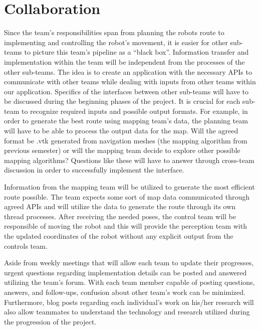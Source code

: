\documentclass[titlepage]{article}
\begin{document}
\section{Collaboration}
Since the team’s responsibilities span from planning the robots route to implementing and controlling the robot’s movement, it is easier for other sub-teams to picture this team’s pipeline as a “black box”. Information transfer and implementation within the team will be independent from the processes of the other sub-teams. The idea is to create an application with the necessary APIs to communicate with other teams while dealing with inputs from other teams within our application. Specifics of the interfaces between other sub-teams will have to be discussed during the beginning phases of the project. It is crucial for each sub-team to recognize required inputs and possible output formats. For example, in order to generate the best route using mapping team’s data, the planning team will have to be able to process the output data for the map. Will the agreed format be .vtk generated from navigation meshes (the mapping algorithm from previous semester) or will the mapping team decide to explore other possible mapping algorithms? Questions like these will have to answer through cross-team discussion in order to successfully implement the interface.

Information from the mapping team will be utilized to generate the most efficient route possible. The team expects some sort of map data communicated through agreed APIs and will utilize the data to generate the route through its own thread processes. After receiving the needed poses, the control team will be responsible of moving the robot and this will provide the perception team with the updated coordinates of the robot without any explicit output from the controls team.   

Aside from weekly meetings that will allow each team to update their progresses, urgent questions regarding implementation details can be posted and answered utilizing the team’s forum. With each team member capable of posting questions, answers, and follow-ups, confusion about other team’s work can be minimized. Furthermore, blog posts regarding each individual’s work on his/her research will also allow teammates to understand the technology and research utilized during the progression of the project.
\end{document}
